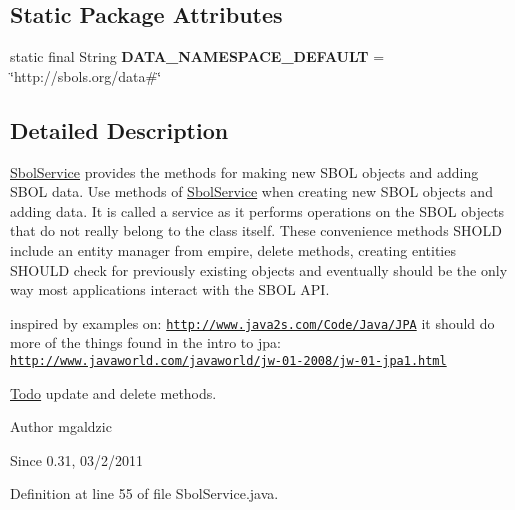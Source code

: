 \subsection*{Static Package Attributes}
\begin{DoxyCompactItemize}
\item 
\hypertarget{classorg_1_1sbolstandard_1_1lib_s_b_o_lj_1_1_sbol_service_a20b86331ad9418b0c6b737a193b5b051}{
static final String {\bfseries DATA\_\-NAMESPACE\_\-DEFAULT} = \char`\"{}http://sbols.org/data\#\char`\"{}}
\label{classorg_1_1sbolstandard_1_1lib_s_b_o_lj_1_1_sbol_service_a20b86331ad9418b0c6b737a193b5b051}

\end{DoxyCompactItemize}


\subsection{Detailed Description}
\hyperlink{classorg_1_1sbolstandard_1_1lib_s_b_o_lj_1_1_sbol_service}{SbolService} provides the methods for making new SBOL objects and adding SBOL data. Use methods of \hyperlink{classorg_1_1sbolstandard_1_1lib_s_b_o_lj_1_1_sbol_service}{SbolService} when creating new SBOL objects and adding data. It is called a service as it performs operations on the SBOL objects that do not really belong to the class itself. These convenience methods SHOLD include an entity manager from empire, delete methods, creating entities SHOULD check for previously existing objects and eventually should be the only way most applications interact with the SBOL API.

inspired by examples on: \href{http://www.java2s.com/Code/Java/JPA}{\tt http://www.java2s.com/Code/Java/JPA} it should do more of the things found in the intro to jpa: \href{http://www.javaworld.com/javaworld/jw-01-2008/jw-01-jpa1.html}{\tt http://www.javaworld.com/javaworld/jw-\/01-\/2008/jw-\/01-\/jpa1.html} \begin{Desc}
\item[\hyperlink{todo__todo000006}{Todo}]update and delete methods.\end{Desc}


\begin{DoxyAuthor}{Author}
mgaldzic 
\end{DoxyAuthor}
\begin{DoxySince}{Since}
0.31, 03/2/2011 
\end{DoxySince}


Definition at line 55 of file SbolService.java.



